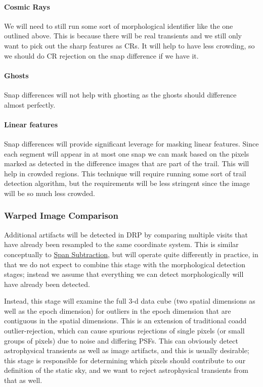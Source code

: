 \paragraph{Cosmic Rays}
We will need to still run some sort of morphological identifier like the one outlined above.  This is because there will be real transients and we still only want to pick out the sharp features as CRs.  It will help to have less crowding, so we should do CR rejection on the snap difference if we have it.

\paragraph{Ghosts}
Snap differences will not help with ghosting as the ghosts should difference almost perfectly.

\paragraph{Linear features}
Snap differences will provide significant leverage for masking linear features.  Since each segment will appear in at most one snap we can mask based on the pixels marked as detected in the difference images that are part of the trail.  This will help in crowded regions.  This technique will require running some sort of trail detection algorithm, but the requirements will be less stringent since the image will be so much less crowded.

\subsubsection{Warped Image Comparison}
\label{sec:acWarpedImageArtifactDetection}

Additional artifacts will be detected in DRP by comparing multiple visits that have already been resampled to the same coordinate system.  This is similar conceptually to \hyperref[sec:acSnapSubtraction]{Span Subtraction}, but will operate quite differently in practice, in that we do not expect to combine this stage with the morphological detection stages; instead we assume that everything we can detect morphologically will have already been detected.

Instead, this stage will examine the full 3-d data cube (two spatial dimensions as well as the epoch dimension) for outliers in the epoch dimension that are contiguous in the spatial dimensions.  This is an extension of traditional coadd outlier-rejection, which can cause spurious rejections of single pixels (or small groups of pixels) due to noise and differing PSFs.  This can obviously detect astrophysical transients as well as image artifacts, and this is usually desirable; this stage is responsible for determining which pixels should contribute to our definition of the static sky, and we want to reject astrophysical transients from that as well.


